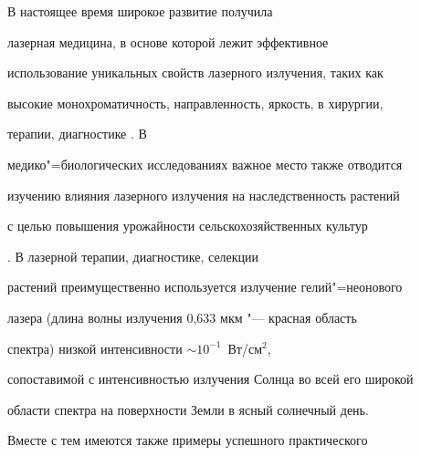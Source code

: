 





\date{04/XII/2012}






\maketitle



 В настоящее время широкое развитие получила

лазерная медицина, в основе которой лежит эффективное

использование уникальных свойств лазерного излучения, таких как

высокие монохроматичность, направленность, яркость, в хирургии,

терапии, диагностике \cite{gur:bib:1, gur:bib:2}. В

медико"=биологических исследованиях важное место также отводится

изучению влияния лазерного излучения на наследственность растений

с целью повышения урожайности сельскохозяйственных культур

\cite{gur:bib:3}. В лазерной терапии, диагностике, селекции

растений преимущественно используется излучение гелий"=неонового

лазера (длина волны излучения 0,633 мкм "--- красная область

спектра) низкой интенсивности $\sim 10^{-1}$~Вт/см$^2$,

сопоставимой с интенсивностью излучения Солнца во всей его широкой

области спектра на поверхности Земли в ясный солнечный день.

Вместе с тем имеются также примеры успешного практического

